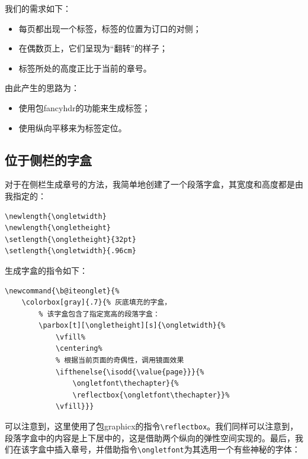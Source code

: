 我们的需求如下：

\begin{itemize}
    \item 每页都出现一个标签，标签的位置为订口的对侧；
    \item 在偶数页上，它们呈现为“翻转”的样子；
    \item 标签所处的高度正比于当前的章号。
\end{itemize}

由此产生的思路为：

\begin{itemize}
    \item 使用包\textsf{fancyhdr}的功能来生成标签；
    \item 使用纵向平移来为标签定位。
\end{itemize}

\subsection{位于侧栏的字盒}

对于在侧栏生成章号的方法，我简单地创建了一个段落字盒，其宽度和高度都是由我指定的：

\begin{dmd}
\begin{verbatim}
\newlength{\ongletwidth}
\newlength{\ongletheight}
\setlength{\ongletheight}{32pt}
\setlength{\ongletwidth}{.96cm}\end{verbatim}
\end{dmd}

生成字盒的指令如下：

\begin{dmd}
\begin{verbatim}
\newcommand{\b@iteonglet}{%
    \colorbox[gray]{.7}{% 灰底填充的字盒，
        % 该字盒包含了指定宽高的段落字盒：
        \parbox[t][\ongletheight][s]{\ongletwidth}{%
            \vfill% 
            \centering%
            % 根据当前页面的奇偶性，调用镜面效果
            \ifthenelse{\isodd{\value{page}}}{%
                \ongletfont\thechapter}{%
                \reflectbox{\ongletfont\thechapter}}% 
            \vfill}}}\end{verbatim}
\end{dmd}

可以注意到，这里使用了包\textsf{graphicx}的指令\verb|\reflectbox|。我们同样可以注意到，段落字盒中的内容是上下居中的，这是借助两个纵向的弹性空间实现的。最后，我们在该字盒中插入章号，并借助指令\verb|\ongletfont|为其选用一个有些神秘的字体：

